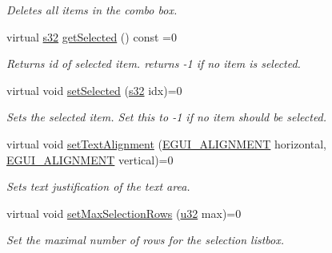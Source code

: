 \begin{DoxyCompactItemize}
\begin{DoxyCompactList}\small\item\em Deletes all items in the combo box. \end{DoxyCompactList}\item 
\mbox{\label{classirr_1_1gui_1_1IGUIComboBox_a7cb6bb2a86fccfc78cbb3c3d56b88778}} 
virtual \hyperlink{namespaceirr_ac66849b7a6ed16e30ebede579f9b47c6}{s32} \hyperlink{classirr_1_1gui_1_1IGUIComboBox_a7cb6bb2a86fccfc78cbb3c3d56b88778}{get\+Selected} () const =0
\begin{DoxyCompactList}\small\item\em Returns id of selected item. returns -\/1 if no item is selected. \end{DoxyCompactList}\item 
\mbox{\label{classirr_1_1gui_1_1IGUIComboBox_a84660e6f4a677349ca7dc39024fe7b17}} 
virtual void \hyperlink{classirr_1_1gui_1_1IGUIComboBox_a84660e6f4a677349ca7dc39024fe7b17}{set\+Selected} (\hyperlink{namespaceirr_ac66849b7a6ed16e30ebede579f9b47c6}{s32} idx)=0
\begin{DoxyCompactList}\small\item\em Sets the selected item. Set this to -\/1 if no item should be selected. \end{DoxyCompactList}\item 
virtual void \hyperlink{classirr_1_1gui_1_1IGUIComboBox_a902681b9cfc783d29270f919ab3e71d8}{set\+Text\+Alignment} (\hyperlink{namespaceirr_1_1gui_a19eb5fb40e67f108cb16aba922ddaa2d}{E\+G\+U\+I\+\_\+\+A\+L\+I\+G\+N\+M\+E\+NT} horizontal, \hyperlink{namespaceirr_1_1gui_a19eb5fb40e67f108cb16aba922ddaa2d}{E\+G\+U\+I\+\_\+\+A\+L\+I\+G\+N\+M\+E\+NT} vertical)=0
\begin{DoxyCompactList}\small\item\em Sets text justification of the text area. \end{DoxyCompactList}\item 
\mbox{\label{classirr_1_1gui_1_1IGUIComboBox_a273f90cfe3cf279ccae2cc612117862d}} 
virtual void \hyperlink{classirr_1_1gui_1_1IGUIComboBox_a273f90cfe3cf279ccae2cc612117862d}{set\+Max\+Selection\+Rows} (\hyperlink{namespaceirr_a0416a53257075833e7002efd0a18e804}{u32} max)=0
\begin{DoxyCompactList}\small\item\em Set the maximal number of rows for the selection listbox. \end{DoxyCompactList}\item 

\end{DoxyCompactItemize}
